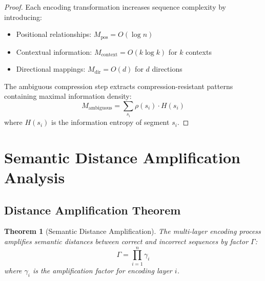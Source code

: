 \documentclass[12pt,a4paper]{article}
\newtheorem{theorem}{Theorem}
\begin{document}
\begin{proof}
Each encoding transformation increases sequence complexity by introducing:
\begin{itemize}
\item Positional relationships: $M_{\text{pos}} = O(\log n)$
\item Contextual information: $M_{\text{context}} = O(k \log k)$ for $k$ contexts
\item Directional mappings: $M_{\text{dir}} = O(d)$ for $d$ directions
\end{itemize}

The ambiguous compression step extracts compression-resistant patterns containing maximal information density:
\begin{equation}
M_{\text{ambiguous}} = \sum_{s_i} \rho(s_i) \cdot H(s_i)
\end{equation}
where $H(s_i)$ is the information entropy of segment $s_i$.
\end{proof}

\section{Semantic Distance Amplification Analysis}

\subsection{Distance Amplification Theorem}

\begin{theorem}[Semantic Distance Amplification]
The multi-layer encoding process amplifies semantic distances between correct and incorrect sequences by factor $\Gamma$:
\begin{equation}
\Gamma = \prod_{i=1}^{n} \gamma_i
\end{equation}
where $\gamma_i$ is the amplification factor for encoding layer $i$.
\end{theorem}
\end{document}
